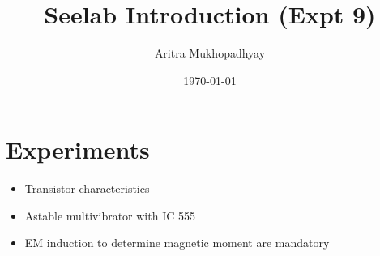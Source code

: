 \documentclass[reprint,amsmath,amssymb,aps]{revtex4-2}
\begin{document}
    \title{Seelab Introduction (Expt 9)}

    \author{Aritra Mukhopadhyay}
    \date{\today}

    
    \maketitle

    \section{Experiments}
        \begin{itemize}
            \item Transistor characteristics
            \item Astable multivibrator with IC 555
            \item EM induction to determine magnetic moment are mandatory 
        \end{itemize}
    
    
    
    
    

    
    \nocite{*}
\end{document}
